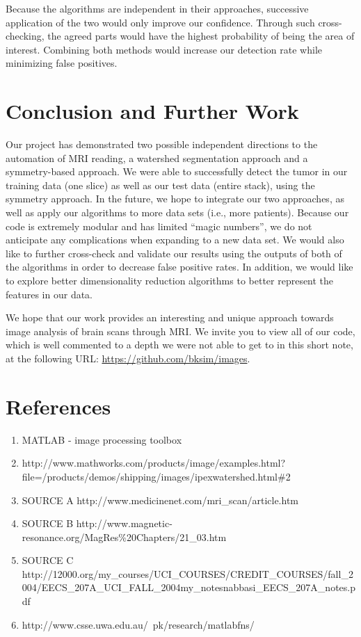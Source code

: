 \documentclass[12pt]{article}
\theoremstyle{plain}%
\theoremstyle{definition}
\theoremstyle{remark}
\begin{document}
Because the algorithms are independent in their approaches, successive application of the two would only improve our confidence.  Through such cross-checking, the agreed parts would have the highest probability of being the area of interest.  Combining both methods would increase our detection rate while minimizing false positives.

\section{Conclusion and Further Work}

Our project has demonstrated two possible independent directions to the automation of MRI reading, a watershed segmentation approach and a symmetry-based approach. We were able to successfully detect the tumor in our training data (one slice) as well as our test data (entire stack), using the symmetry approach. In the future, we hope to integrate our two approaches, as well as apply our algorithms to more data sets (i.e., more patients). Because our code is extremely modular and has limited ``magic numbers'', we do not anticipate any complications when expanding to a new data set. We would also like to further cross-check and validate our results using the outputs of both of the algorithms in order to decrease false positive rates. In addition, we would like to explore better dimensionality reduction algorithms to better represent the features in our data.

We hope that our work provides an interesting and unique approach towards image analysis of brain scans through MRI. We invite you to view all of our code, which is well commented to a depth we were not able to get to in this short note, at the following URL: \url{https://github.com/bksim/images}.

\section{References}
\begin{enumerate}
\item \textsc{MATLAB} - image processing toolbox
\item http://www.mathworks.com/products/image/examples.html?file=/products/demos/shipping/images/ipexwatershed.html\#2
\item SOURCE A http://www.medicinenet.com/mri\_scan/article.htm
\item SOURCE B http://www.magnetic-resonance.org/MagRes\%20Chapters/21\_03.htm
\item SOURCE C http://12000.org/my\_courses/UCI\_COURSES/CREDIT\_COURSES/fall\_2004/EECS\_207A\_UCI\_FALL\_2004\/my\_notes\/nabbasi\_EECS\_207A\_notes.pdf
\item http://www.csse.uwa.edu.au/~pk/research/matlabfns/

\end{enumerate}
	
\end{document}
